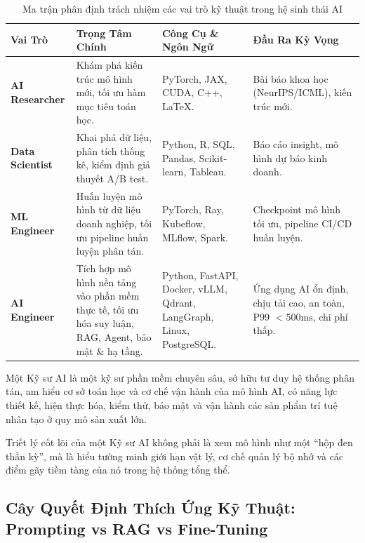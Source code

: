 \begin{table}[htbp]
\centering
\small
\setlength{\tabcolsep}{4pt}
\caption{Ma trận phân định trách nhiệm các vai trò kỹ thuật trong hệ sinh thái AI}
\label{tbl:role-comparison}
\begin{tabular}{p{}p{}p{}p{}}
\toprule
\textbf{Vai Trò} & \textbf{Trọng Tâm Chính} & \textbf{Công Cụ \& Ngôn Ngữ} & \textbf{Đầu Ra Kỳ Vọng} \\
\midrule
\textbf{AI Researcher} & Khám phá kiến trúc mô hình mới, tối ưu hàm mục tiêu toán học. & PyTorch, JAX, CUDA, C++, LaTeX. & Bài báo khoa học (NeurIPS/ICML), kiến trúc mới. \\
\addlinespace
\textbf{Data Scientist} & Khai phá dữ liệu, phân tích thống kê, kiểm định giả thuyết A/B test. & Python, R, SQL, Pandas, Scikit-learn, Tableau. & Báo cáo insight, mô hình dự báo kinh doanh. \\
\addlinespace
\textbf{ML Engineer} & Huấn luyện mô hình từ dữ liệu doanh nghiệp, tối ưu pipeline huấn luyện phân tán. & PyTorch, Ray, Kubeflow, MLflow, Spark. & Checkpoint mô hình tối ưu, pipeline CI/CD huấn luyện. \\
\addlinespace
\textbf{AI Engineer} & Tích hợp mô hình nền tảng vào phần mềm thực tế, tối ưu hóa suy luận, RAG, Agent, bảo mật \& hạ tầng. & Python, FastAPI, Docker, vLLM, Qdrant, LangGraph, Linux, PostgreSQL. & Ứng dụng AI ổn định, chịu tải cao, an toàn, P99 $< 500\text{ms}$, chi phí thấp. \\
\bottomrule
\end{tabular}
\end{table}

\begin{definition}
Một Kỹ sư AI là một kỹ sư phần mềm chuyên sâu, sở hữu tư duy hệ thống phân tán, am hiểu cơ sở toán học và cơ chế vận hành của mô hình AI, có năng lực thiết kế, hiện thực hóa, kiểm thử, bảo mật và vận hành các sản phẩm trí tuệ nhân tạo ở quy mô sản xuất lớn.
\end{definition}

Triết lý cốt lõi của một Kỹ sư AI không phải là xem mô hình như một ``hộp đen thần kỳ'', mà là hiểu tường minh giới hạn vật lý, cơ chế quản lý bộ nhớ và các điểm gãy tiềm tàng của nó trong hệ thống tổng thể.

\subsection{Cây Quyết Định Thích Ứng Kỹ Thuật: Prompting vs RAG vs Fine-Tuning}


